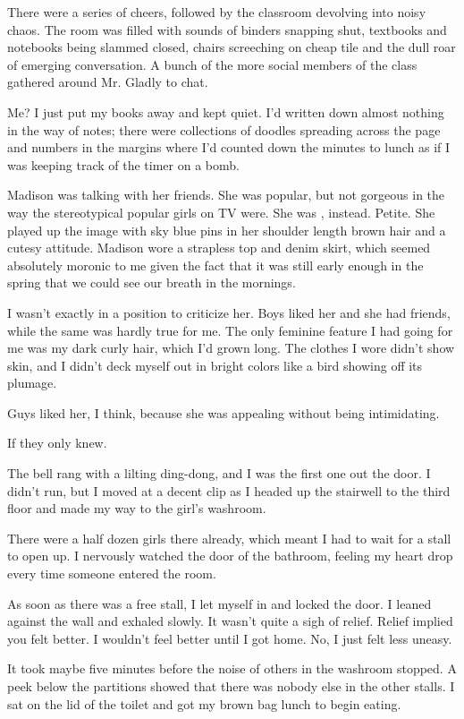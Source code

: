 There were a series of cheers, followed by the classroom devolving into noisy chaos. The room was filled with sounds of binders snapping shut, textbooks and notebooks being slammed closed, chairs screeching on cheap tile and the dull roar of emerging conversation. A bunch of the more social members of the class gathered around Mr. Gladly to chat.

Me? I just put my books away and kept quiet. I'd written down almost nothing in the way of notes; there were collections of doodles spreading across the page and numbers in the margins where I'd counted down the minutes to lunch as if I was keeping track of the timer on a bomb.

Madison was talking with her friends. She was popular, but not gorgeous in the way the stereotypical popular girls on TV were. She was , instead. Petite. She played up the image with sky blue pins in her shoulder length brown hair and a cutesy attitude. Madison wore a strapless top and denim skirt, which seemed absolutely moronic to me given the fact that it was still early enough in the spring that we could see our breath in the mornings.

I wasn't exactly in a position to criticize her. Boys liked her and she had friends, while the same was hardly true for me. The only feminine feature I had going for me was my dark curly hair, which I'd grown long. The clothes I wore didn't show skin, and I didn't deck myself out in bright colors like a bird showing off its plumage.

Guys liked her, I think, because she was appealing without being intimidating.

If they only knew.

The bell rang with a lilting ding-dong, and I was the first one out the door. I didn't run, but I moved at a decent clip as I headed up the stairwell to the third floor and made my way to the girl's washroom.

There were a half dozen girls there already, which meant I had to wait for a stall to open up. I nervously watched the door of the bathroom, feeling my heart drop every time someone entered the room.

As soon as there was a free stall, I let myself in and locked the door. I leaned against the wall and exhaled slowly. It wasn't quite a sigh of relief. Relief implied you felt better. I wouldn't feel better until I got home. No, I just felt less uneasy.

It took maybe five minutes before the noise of others in the washroom stopped. A peek below the partitions showed that there was nobody else in the other stalls. I sat on the lid of the toilet and got my brown bag lunch to begin eating.

